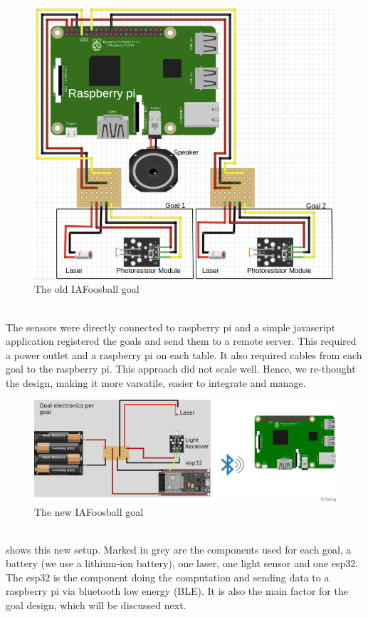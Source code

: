 \begin{figure}[h!]
    \centering
    \includegraphics[scale=0.3]{figures/goal-old.png}%
    \caption{The old IAFoosball goal}\label{fig:goalOld}
\end{figure}\\
The sensors were directly connected to raspberry pi and a simple javascript application registered the goals and send them to a remote server. This required a power outlet and a raspberry pi on each table. It also required cables from each goal to the raspberry pi. This approach did not scale well. Hence, we re-thought the design, making it more varsatile, easier to integrate and manage. 
\begin{figure}[h!]
    \centering
    \includegraphics[scale=0.3]{figures/goal-new.png}%
    \caption{The new IAFoosball goal}\label{fig:goalNew}
\end{figure}\\
 shows this new setup. Marked in grey are the components used for each goal, a battery (we use a lithium-ion battery), one laser, one light sensor and one esp32. The esp32 is the component doing the computation and sending data to a raspberry pi via bluetooth low energy (BLE). It is also the main factor for the goal design, which will be discussed next. 